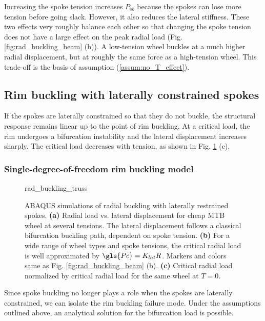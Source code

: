 \documentclass[\rootdir/thesis.tex]{subfiles}
\begin{document}
Increasing the spoke tension increases $P_{sb}$ because the spokes can lose more tension before going slack. However, it also reduces the lateral stiffness. These two effects very roughly balance each other so that changing the spoke tension does not have a large effect on the peak radial load (Fig. \ref{fig:rad_buckling_beam} (b)). A low-tension wheel buckles at a much higher radial displacement, but at roughly the same force as a high-tension wheel. This trade-off is the basis of assumption (\ref{assum:no_T_effect}).

\subsection{Rim buckling with laterally constrained spokes}

If the spokes are laterally constrained so that they do not buckle, the structural response remains linear up to the point of rim buckling. At a critical load, the rim undergoes a bifurcation instability and the lateral displacement increases sharply. The critical load decreases with tension, as shown in Fig. \ref{fig:rad_buckling_truss} (c).

\subsubsection*{Single-degree-of-freedom rim buckling model}

\begin{figure}[t]
\centering
{rad_buckling_truss} 
\caption[Buckling of wheels with laterally restrained spokes]{ABAQUS simulations of radial buckling with laterally restrained spokes. \textbf{(a)} Radial load vs. lateral displacement for cheap MTB wheel at several tensions. The lateral displacement follows a classical bifurcation buckling path, dependent on spoke tension. \textbf{(b)} For a wide range of wheel types and spoke tensions, the critical radial load is well approximated by $\gls{Pc} = K_{lat}R$. Markers and colors same as Fig. \ref{fig:rad_buckling_beam} (b). \textbf{(c)} Critical radial load normalized by critical radial load for the same wheel at $T=0$.}
\label{fig:rad_buckling_truss}
\end{figure}

Since spoke buckling no longer plays a role when the spokes are laterally constrained, we can isolate the rim buckling failure mode. Under the assumptions outlined above, an analytical solution for the bifurcation load is possible.
\end{document}
